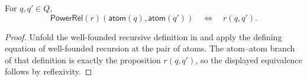 \begin{lemma}
For $q,q'\in Q$,
\[
\mathsf{PowerRel}(r)(\mathsf{atom}(q),\mathsf{atom}(q'))
\quad\Longleftrightarrow\quad r(q,q').
\]
\end{lemma}
\begin{proof}
Unfold the well-founded recursive definition in  and
apply the defining equation of well-founded recursion at the pair of atoms.
The atom--atom branch of that definition is exactly the proposition
$r(q,q')$, so the displayed equivalence follows by reflexivity.
\end{proof}
